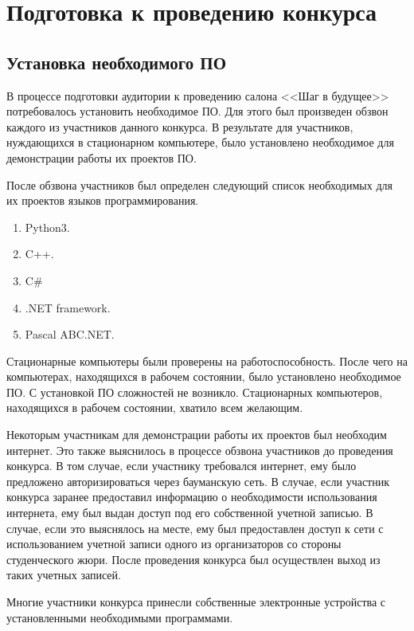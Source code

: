 \chapter{Подготовка к проведению конкурса}

\section{Установка необходимого ПО}

В процессе подготовки аудитории к проведению салона <<Шаг в будущее>> потребовалось установить необходимое ПО. 
Для этого был произведен обзвон каждого из участников данного конкурса. В результате для участников, нуждающихся 
в стационарном компьютере, было установлено необходимое для демонстрации работы их проектов ПО.

После обзвона участников был определен следующий список необходимых для их проектов языков программирования.
\begin{enumerate}
    \item Python3.
    \item C++.
    \item C\#
    \item .NET framework.
    \item Pascal ABC.NET.
\end{enumerate}

Стационарные компьютеры были проверены на работоспособность. После чего на компьютерах, находящихся в рабочем состоянии, 
было установлено необходимое ПО. С установкой ПО сложностей не возникло. Стационарных компьютеров, находящихся в рабочем состоянии, 
хватило всем желающим.

Некоторым участникам для демонстрации работы их проектов был необходим интернет. Это также выяснилось в процессе обзвона участников 
до проведения конкурса. В том случае, если участнику требовался интернет, ему было предложено авторизироваться через бауманскую сеть. 
В случае, если участник конкурса заранее предоставил информацию о необходимости использования интернета, ему был выдан доступ под его 
собственной учетной записью. В случае, если это выяснялось на месте, ему был предоставлен доступ к сети с использованием учетной записи 
одного из организаторов со стороны студенческого жюри. После проведения конкурса был осуществлен выход из таких учетных записей. 

Многие участники конкурса принесли собственные электронные устройства с установленными необходимыми программами.


